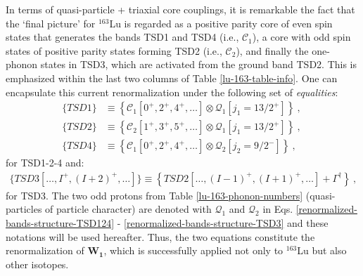 In terms of quasi-particle + triaxial core couplings, it is remarkable the fact that the `final picture' for $^{163}$Lu is regarded as a positive parity core of even spin states that generates the bands TSD1 and TSD4 (i.e., $\mathscr{C}_1$), a core with odd spin states of positive parity states forming TSD2 (i.e., $\mathscr{C}_2$), and finally the one-phonon states in TSD3, which are activated from the ground band TSD2. This is emphasized within the last two columns of Table \ref{lu-163-table-info}. One can encapsulate this current renormalization under the following set of \emph{equalities}:
\begin{align}
    \{TSD1\}&\equiv\left\{\mathscr{C}_1\left[0^+,2^+,4^+,\dots\right] \otimes \mathcal{Q}_1[j_1=13/2^+]\right\}\ ,\ \nonumber\\
    \{TSD2\}&\equiv\left\{\mathscr{C}_2\left[1^+,3^+,5^+,\dots\right] \otimes \mathcal{Q}_1[j_1=13/2^+]\right\}\ ,\ \nonumber\\
    \{TSD4\}&\equiv\left\{\mathscr{C}_1\left[0^+,2^+,4^+,\dots\right] \otimes \mathcal{Q}_2[j_2=9/2^-]\right\}\ ,
    \label{renormalized-bands-structure-TSD124}
\end{align}
for TSD1-2-4 and:
\begin{align}
    \{TSD3\left[\dots,I^+,(I+2)^+,\dots\right]\}\equiv\left\{TSD2\left[\dots,(I-1)^+,(I+1)^+,\dots\right]+\Gamma^\dagger\right\}\ ,
    \label{renormalized-bands-structure-TSD3}
\end{align}
for TSD3. The two odd protons from Table \ref{lu-163-phonon-numbers} (quasi-particles of particle character) are denoted with $\mathcal{Q}_1$ and $\mathcal{Q}_2$ in Eqs. \ref{renormalized-bands-structure-TSD124} - \ref{renormalized-bands-structure-TSD3} and these notations will be used hereafter. Thus, the two equations constitute the renormalization of $\mathbf{W_1}$, which is successfully applied not only to $^{163}$Lu but also other isotopes.%

